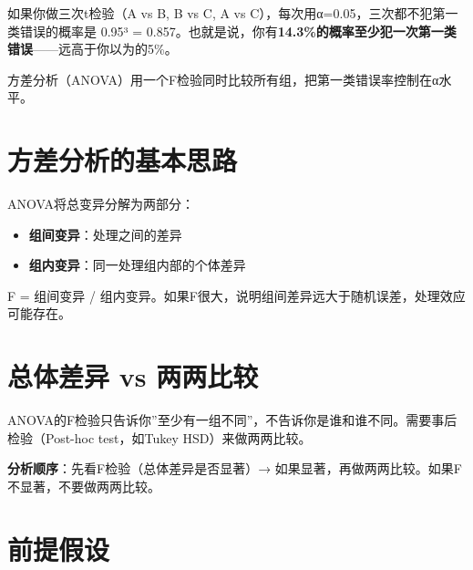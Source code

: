 \documentclass[
  letterpaper,
]{scrbook}
\providecommand{\tightlist}{%
  \setlength{\itemsep}{0pt}\setlength{\parskip}{0pt}}
\begin{document}
如果你做三次t检验（A vs B, B vs C, A vs
C），每次用α=0.05，三次都不犯第一类错误的概率是 0.95³ =
0.857。也就是说，你有\textbf{14.3\%的概率至少犯一次第一类错误}------远高于你以为的5\%。

方差分析（ANOVA）用一个F检验同时比较所有组，把第一类错误率控制在α水平。

\section{方差分析的基本思路}\label{ux65b9ux5deeux5206ux6790ux7684ux57faux672cux601dux8def}

ANOVA将总变异分解为两部分：

\begin{itemize}
\tightlist
\item
  \textbf{组间变异}：处理之间的差异
\item
  \textbf{组内变异}：同一处理组内部的个体差异
\end{itemize}

F = 组间变异 /
组内变异。如果F很大，说明组间差异远大于随机误差，处理效应可能存在。

\section{总体差异 vs
两两比较}\label{ux603bux4f53ux5deeux5f02-vs-ux4e24ux4e24ux6bd4ux8f83}

ANOVA的F检验只告诉你''至少有一组不同''，不告诉你是谁和谁不同。需要事后检验（Post-hoc
test，如Tukey HSD）来做两两比较。

\begin{tcolorbox}[enhanced jigsaw, arc=.35mm, bottomrule=.15mm, bottomtitle=1mm, breakable, colback=white, colbacktitle=quarto-callout-important-color!10!white, colframe=quarto-callout-important-color-frame, coltitle=black, left=2mm, leftrule=.75mm, opacityback=0, opacitybacktitle=0.6, rightrule=.15mm, title=\textcolor{quarto-callout-important-color}{\faExclamation}\hspace{0.5em}{Important}, titlerule=0mm, toprule=.15mm, toptitle=1mm]

\textbf{分析顺序}：先看F检验（总体差异是否显著）→
如果显著，再做两两比较。如果F不显著，不要做两两比较。

\end{tcolorbox}

\section{前提假设}\label{ux524dux63d0ux5047ux8bbe}
\end{document}
